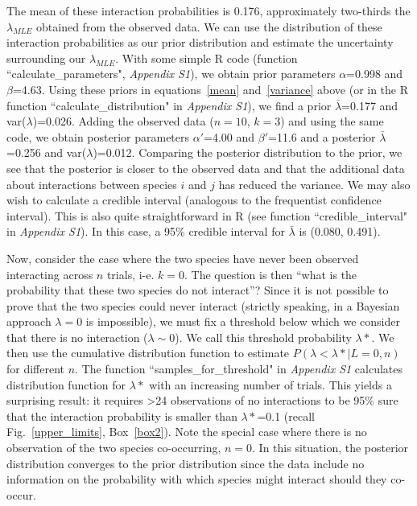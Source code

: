 \documentclass[12pt]{article}
\begin{document}
\begin{spacing}{2.0}
    The mean of these interaction probabilities is 0.176, approximately two-thirds the $\lambda_{MLE}$ obtained from the observed data. We can use the distribution of these interaction probabilities as our prior distribution and estimate the uncertainty surrounding our $\lambda_{MLE}$. With some simple R code (function ``calculate\_parameters", \emph{Appendix S1}), we obtain prior parameters $\alpha$=0.998 and $\beta$=4.63. Using these priors in equations~\ref{mean} and~\ref{variance} above (or in the R function ``calculate\_distribution" in \emph{Appendix S1}), we find a prior $\bar\lambda$=0.177 and var($\lambda$)=0.026. Adding the observed data ($n=10$, $k=3$) and using the same code, we obtain posterior parameters $\alpha'$=4.00 and $\beta'$=11.6 and a posterior $\bar\lambda$=0.256 and var($\lambda$)=0.012. Comparing the posterior distribution to the prior, we see that the posterior is closer to the observed data and that the additional data about interactions between species $i$ and $j$ has reduced the variance. We may also wish to calculate a credible interval (analogous to the frequentist confidence interval). This is also quite straightforward in R (see function ``credible\_interval" in \emph{Appendix S1}). In this case, a 95\% credible interval for $\bar\lambda$ is (0.080, 0.491).


    Now, consider the case where the two species have never been observed interacting across $n$ trials, i-e. $k=0$. The question is then ``what is the probability that these two species do not interact''? Since it is not possible to prove that the two species could never interact (strictly speaking, in a Bayesian approach $\lambda=0$ is impossible), we must fix a threshold below which we consider that there is no interaction ($\lambda \sim 0$). We call this threshold probability $\lambda*$. We then use the cumulative distribution function to estimate $P(\lambda<\lambda*|L=0,n)$ for different $n$. The function ``samples\_for\_threshold" in \emph{Appendix S1} calculates distribution function for $\lambda*$ with an increasing number of trials. This yields a surprising result: it requires \textgreater24 observations of no interactions to be 95\% sure that the interaction probability is smaller than $\lambda*$=0.1 (recall Fig.~\ref{upper_limits}, Box~\ref{box2}). Note the special case where there is no observation of the two species co-occurring, $n = 0$.  In this situation, the posterior distribution converges to the prior distribution since the data include no information on the probability with which species might interact should they co-occur.



\end{spacing}
\end{document}
